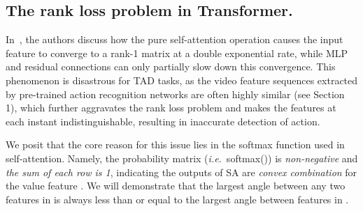 \documentclass[10pt,twocolumn,letterpaper]{article}
\def\ie{{\em i.e.}}
\begin{document}
\begin{figure}[t!]
\end{figure}

\begin{table}[t]
\end{table}

\subsection{The rank loss problem in Transformer.}
In~\cite{dong2021attention}, the authors discuss how the pure self-attention operation causes the input feature to converge to a rank-1 matrix at a double exponential rate, while MLP and residual connections can only partially slow down this convergence. This phenomenon is disastrous for TAD tasks, as the video feature sequences extracted by pre-trained action recognition networks are often highly similar (see Section 1), which further aggravates the rank loss problem and makes the features at each instant indistinguishable, resulting in inaccurate detection of action.

We posit that the core reason for this issue lies in the softmax function used in self-attention. Namely, the probability matrix (\ie~softmax()) is \emph{non-negative} and \emph{the sum of each row is 1}, indicating the outputs of SA are \emph{convex combination} for the value feature . We will demonstrate that the largest angle between any two features in  is always less than or equal to the largest angle between features in .
\end{document}
